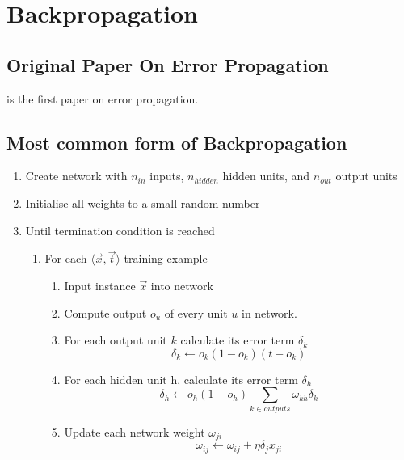 \documentclass[10pt,a4paper]{article}
\begin{document}
\citep{Michell2009}
\section{Backpropagation}
\subsection{Original Paper On Error Propagation}
\cite{rumel} is the first paper on error propagation.

\subsection{Most common form of Backpropagation}
\begin{enumerate}
\item Create network with $n_{in}$ inputs, $n_{hidden}$ hidden units, and $n_{out}$ output units
\item Initialise all weights to a small random number 
\item Until termination condition is reached
    \begin{enumerate}
    \item For each $\langle\vec{x},\vec{t}\rangle$ training example
         \begin{enumerate}
         \item Input instance $\vec{x}$ into network
         \item Compute output $o_u$ of every unit $u$ in network.
         \item For each output unit $k$ calculate its error term $\delta_k$
             \begin{equation}
             \delta_k \leftarrow o_k(1-o_k)(t-o_k)
             \end{equation}
         \item For each hidden unit h, calculate its error term $\delta_h$
             \begin{equation}
             \delta_h \leftarrow o_h(1-o_h)\sum_{k\in outputs} \omega_{kh}\delta_k
             \end{equation}
         \item Update each network weight $\omega_{ji}$
             \begin{equation}
             \label{backpropupdate}
             \omega_{ij} \leftarrow \omega_{ij} + \eta \delta_j x_{ji}
             \end{equation}                                          
         \end{enumerate}                 
    \end{enumerate}
\end{enumerate}
\end{document}

